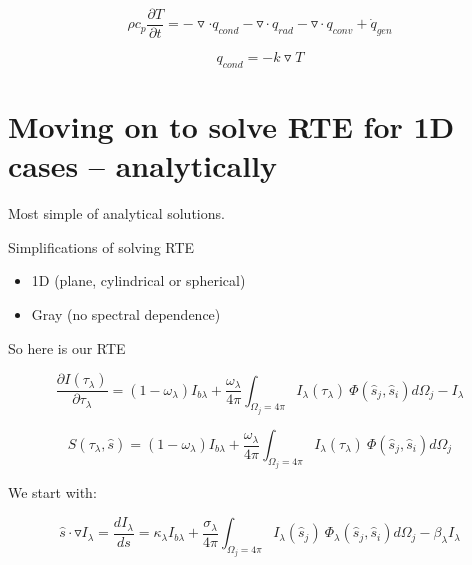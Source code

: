 \documentclass[12pt]{article}
\renewcommand{\_}{\kern-1.5pt\textunderscore\kern-1.5pt}
\begin{document}
 \[  \rho c_{p}\frac{ \partial T}{ \partial t}=-\triangledown  \cdot q_{cond}-\triangledown  \cdot q_{rad}-\triangledown  \cdot q_{conv}+\dot{q}_{gen} \] \par

 \[ q_{cond}=-k\triangledown T \] \par

\section*{Moving on to solve RTE for 1D cases – analytically}
Most simple of analytical solutions.\par

Simplifications of solving RTE\par
\begin{itemize}
	\item 1D (plane, cylindrical or spherical)\par

	\item Gray (no spectral dependence)\par
\end{itemize}


So here is our RTE\par

 \[ \frac{ \partial I \left(  \tau_{ \lambda } \right) }{ \partial  \tau_{ \lambda }}= \left( 1- \omega _{ \lambda } \right)  I_{b \lambda }+\frac{ \omega _{ \lambda }}{4 \pi } \int _{ \Omega _{j}=4 \pi }^{}I_{ \lambda } \left(  \tau_{ \lambda } \right) ~ \Phi  \left( \hat{s}_{j},\hat{s}_{i} \right) d \Omega _{j}-I_{ \lambda } \] \par

 \[ S \left(  \tau_{ \lambda },\hat{s} \right) = \left( 1- \omega _{ \lambda } \right)  I_{b \lambda }+\frac{ \omega _{ \lambda }}{4 \pi } \int _{ \Omega _{j}=4 \pi }^{}I_{ \lambda } \left(  \tau_{ \lambda } \right) ~ \Phi  \left( \hat{s}_{j},\hat{s}_{i} \right) d \Omega _{j} \] \par

We start with:\par

 \[ \hat{s} \cdot \triangledown I_{ \lambda }=\frac{dI_{ \lambda }}{ds}= \kappa _{ \lambda }I_{b \lambda }+\frac{ \sigma _{ \lambda }}{4 \pi } \int _{ \Omega _{j}=4 \pi }^{}I_{ \lambda } \left( \hat{s}_{j} \right) ~ \Phi _{ \lambda } \left( \hat{s}_{j},\hat{s}_{i} \right) d \Omega _{j}- \beta _{ \lambda }I_{ \lambda } \] \par
\end{document}
